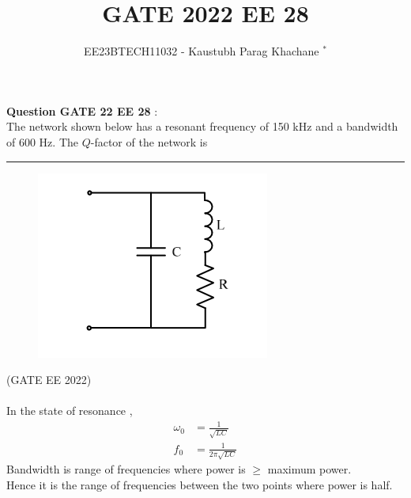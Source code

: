 \documentclass[journal,12pt,twocolumn]{IEEEtran}
\theoremstyle{remark}
\begin{document}

\vspace{3cm}

\Large\title{GATE 2022 EE 28}
\large\author{EE23BTECH11032 - Kaustubh Parag Khachane $^{*}$%
}
\maketitle
\newpage
\bigskip

\renewcommand{\thefigure}{\theenumi}
\renewcommand{\thetable}{\theenumi}
\large\textbf{Question GATE 22 EE 28} :\\
The network shown below has a resonant frequency of 150 kHz and a bandwidth of
600 Hz. The $Q$-factor of the network is \rule{1cm}{0.15mm}
\begin{figure}[!ht]
\centering
\begin{center}
\includegraphics[width=\columnwidth]{question}
\end{center}
\end{figure}
\hfill(GATE EE 2022)\\
\solution\\

In the state of resonance ,
\begin{align}
    \omega_0 &= \frac{1}{\sqrt{LC}}\label{eq:eq1}\\
    f_0 &= \frac{1}{2\pi \sqrt{LC}}
\end{align}
Bandwidth is range of frequencies where power is $\geq$ maximum power.\\
Hence it is the range of frequencies between the two points where power is half.\\
\end{document}
